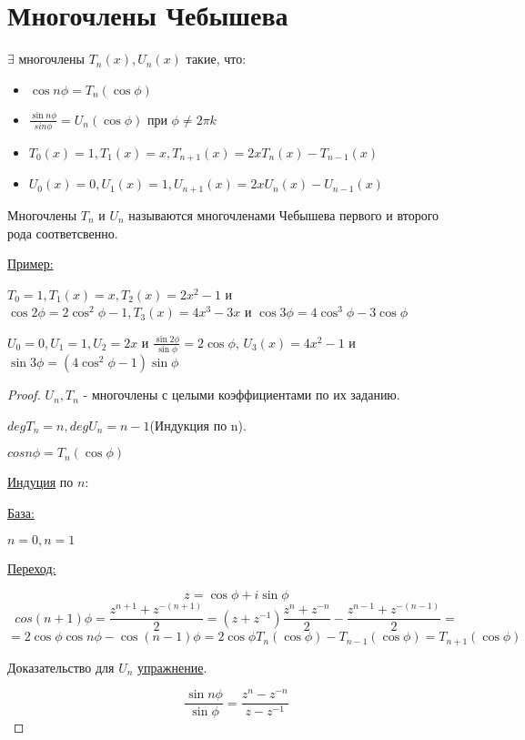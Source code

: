 \section{Многочлены Чебышева}
\begin{theorem}{}
$\exists$ многочлены $T_n(x), U_n(x)$ такие, что:
\begin{itemize}
\item $\cos{n \phi} = T_n(\cos \phi)$
\item $\frac{\sin{n \phi}}{sin \phi} = U_n(\cos \phi)$ при $\phi \ne 2 \pi k$
\item $T_0(x) = 1, T_1(x) = x, T_{n + 1}(x) = 2xT_n(x) - T_{n - 1}(x)$
\item $U_0(x) = 0, U_1(x) = 1, U_{n + 1}(x) = 2xU_n(x) - U_{n - 1}(x)$
\end{itemize}
\end{theorem}
\begin{Def} Многочлены $T_n$ и $U_n$ называются многочленами Чебышева первого и второго рода соответсвенно.
\end{Def}

\underline{Пример:} 

$T_0 = 1, T_1(x) = x, T_2(x) = 2x^2 - 1$ и $\cos 2\phi = 2 \cos^2 \phi - 1, T_3(x) = 4x^3 - 3x$ и $\cos 3\phi = 4 \cos^3 \phi - 3\cos \phi$ 

$U_0 = 0, U_1 = 1, U_2 = 2x$ и $\frac{\sin 2\phi}{\sin \phi} = 2\cos \phi$, $U_3(x) = 4x^2 - 1$ и $\sin 3\phi = (4\cos^2 \phi - 1)\sin \phi$

\begin{proof}

$U_n, T_n$ - многочлены с целыми коэффициентами по их заданию. 

$deg T_n = n, deg U_n = n - 1$(Индукция по n).  

$cos{n\phi} = T_n(\cos\phi)$

\underline{Индуция} по $n$:

\underline{База:}

$n = 0, n = 1$

\underline{Переход:}

$$z = \cos\phi + i \sin\phi$$
$$cos{(n + 1)\phi} = \frac{z^{n + 1} + z^{-(n + 1)}}{2} = (z + z^{-1})\frac{z^n + z^{-n}}{2} - \frac{z^{n - 1} + z^{-(n - 1)}}{2}=$$
$$= 2\cos\phi\cos{n\phi} - \cos{(n - 1)\phi} = 2 \cos \phi T_n(\cos \phi) - T_{n - 1}(\cos\phi) = T_{n + 1}(\cos \phi)$$

Доказательство для $U_n$ \underline{упражнение}.

$$\frac{\sin{n\phi}}{\sin\phi} = \frac{z^n - z^{-n}}{z - z^{-1}}$$
\end{proof}
